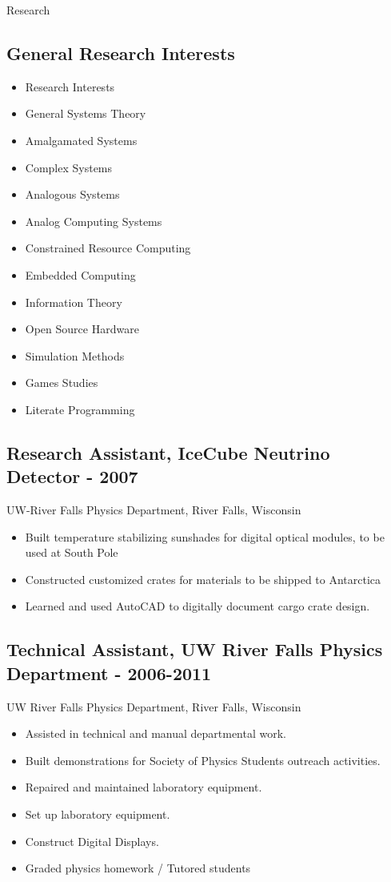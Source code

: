 \documentclass{resume} %
\begin{document}
\begin{rSection}{Research}

\subsection*{General Research Interests}
\begin{itemize}
    \item Research Interests
    \item General Systems Theory
    \item Amalgamated Systems
    \item Complex Systems
    \item Analogous Systems
    \item Analog Computing Systems
    \item Constrained Resource Computing
    \item Embedded Computing
    \item Information Theory
    \item Open Source Hardware
    \item Simulation Methods
    \item Games Studies
    \item Literate Programming
\end{itemize}    

\subsection*{Research Assistant, IceCube Neutrino Detector - 2007}
UW-River Falls Physics Department, River Falls, Wisconsin 
\begin{itemize}
    \item Built temperature stabilizing sunshades for digital optical modules,
to be used at South Pole
    \item Constructed customized crates for materials to be shipped to
Antarctica
    \item Learned and used AutoCAD to digitally document cargo crate design.
\end{itemize}

\subsection*{Technical Assistant, UW River Falls Physics Department - 2006-2011}
UW River Falls Physics Department, River Falls, Wisconsin
\begin{itemize}
    \item Assisted in technical and manual departmental work.
    \item Built demonstrations for Society of Physics Students outreach activities.
    \item Repaired and maintained laboratory equipment.
    \item Set up laboratory equipment.
    \item Construct Digital Displays.
    \item Graded physics homework / Tutored students
\end{itemize}


\end{rSection}
\end{document}
